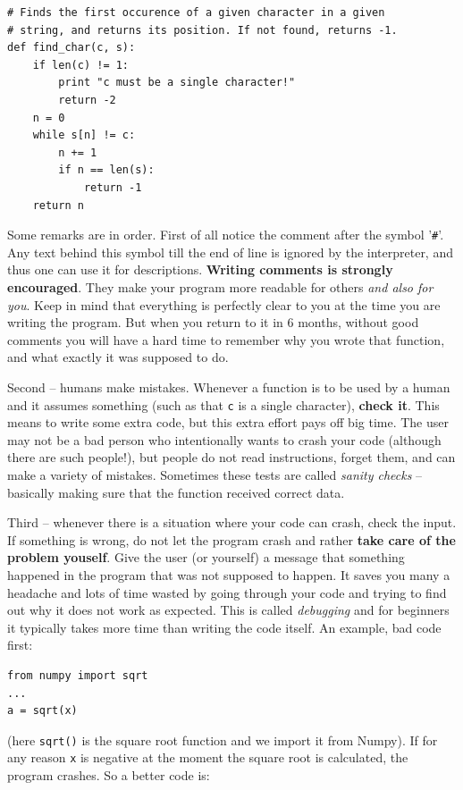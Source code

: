 \documentclass[article,A4,12pt]{llncs}
\begin{document}
\begin{verbatim}
# Finds the first occurence of a given character in a given 
# string, and returns its position. If not found, returns -1. 
def find_char(c, s):
    if len(c) != 1: 
        print "c must be a single character!"
        return -2
    n = 0
    while s[n] != c:
        n += 1
        if n == len(s):
            return -1
    return n
\end{verbatim}
Some remarks are in order. First of all notice the comment after the 
symbol '{\tt \#}'. Any text behind this symbol till the end of line is ignored 
by the interpreter, and thus one can use it for descriptions. {\bf Writing 
comments is strongly encouraged}. They make your program more readable for others
{\em and also for you}. Keep in mind that everything is perfectly clear to you 
at the time you are writing the program. But when you return to it in 6 months, 
without good comments you will have a hard time to remember why you wrote that 
function, and what exactly it was supposed to do. 

Second -- humans make mistakes. Whenever a function is to be used by a human
and it assumes something (such as that {\tt c} is a single character), {\bf check
it}. This means to write some extra code, but this extra effort pays off big time.
The user may not be a bad person who intentionally wants to crash your 
code (although there are such people!), but people do not read instructions, 
forget them, and can make a variety 
of mistakes. Sometimes these tests are called {\em sanity checks} -- basically
making sure that the function received correct data.

Third -- whenever there is 
a situation where your code can crash, check the input. If something is wrong,
do not let the program crash and rather {\bf take care of the problem youself}. 
Give the user (or yourself) a message that something happened in the program that 
was not supposed 
to happen. It saves you many a headache and lots of time wasted by going through 
your code and trying to find out why it does not work as expected. This is called 
{\em debugging} and for beginners it typically takes more time than writing the 
code itself. An example, bad code first:

\begin{verbatim}
from numpy import sqrt
...
a = sqrt(x)
\end{verbatim}
(here {\tt sqrt()} is the square root function and we import it from Numpy). If
for any reason {\tt x} is negative at the moment the square root is calculated,
the program crashes. So a better code is:
\end{document}
